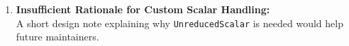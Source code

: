 \documentclass[12pt,a4paper]{article}
\begin{document}
\begin{enumerate}

  \item \textbf{Insufficient Rationale for Custom Scalar Handling:}\\
        A short design note explaining why
        \texttt{UnreducedScalar} is needed would help future
        maintainers.
\end{enumerate}


\end{document}
